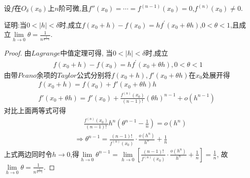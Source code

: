\documentclass[lang=cn,newtx,10pt,scheme=chinese]{elegantbook}
\begin{document}
\begin{exercise}
    设\(f\)在\(O_{\delta}(x_0)\)上\(n\)阶可微,且\(f''(x_0)=\cdots =f^{(n - 1)}(x_0)=0\),\(f^{(n)}(x_0)\neq0\).
    
    证明:当\(0<|h|<\delta\)时,成立\(f(x_0 + h)-f(x_0)=hf^{\prime}(x_0+\theta h)\),\(0<\theta<1\),且成立$\lim\limits_{h\to0}\theta=\frac{1}{n^{\frac{1}{n - 1}}}$.
\end{exercise}
    \begin{proof}
        由$Lagrange$中值定理可得,
        当\(0<|h|<\delta\)时,成立
        \begin{gather}
            f(x_0 + h)-f(x_0)=hf^{\prime}(x_0+\theta h),0<\theta<1
            \nonumber
        \end{gather}
        由带$Peano$余项的$Taylor$公式分别将$f\left( x_0+h \right),f'\left( x_0+\theta h \right)$在$x_0$处展开得
        \begin{gather}
            f\left( x_0+h \right) =f\left( x_0 \right) +f'\left( x_0+\theta h \right) h
            \nonumber\\
            f'\left( x_0+\theta h \right) =f'\left( x_0 \right) +\frac{f^{\left( n \right)}\left( x_0 \right)}{\left( n-1 \right) !}\left( \theta h \right) ^{n-1}+o\left( h^{n-1} \right) \,\,
            \nonumber
        \end{gather}
        对比上面两等式可得
        \begin{equation}
            \begin{split}
                &\,\,\,\,\,\,\,\,\frac{f^{\left( n \right)}\left( x_0 \right)}{\left( n-1 \right) !}h^n\left( \theta ^{n-1}-\frac{1}{n} \right) =o\left( h^n \right) 
                \\
                &\Rightarrow \theta ^{n-1}=\frac{\left( n-1 \right) !}{f^{\left( n \right)}\left( x_0 \right)}\cdot \frac{o\left( h^n \right)}{h^n}+\frac{1}{n}    
            \end{split}
            \nonumber
        \end{equation}
        上式两边同时令$h\to0$,得$\underset{h\rightarrow 0}{\lim}\theta ^{n-1}=\underset{h\rightarrow 0}{\lim}\left[ \frac{\left( n-1 \right) !}{f^{\left( n \right)}\left( x_0 \right)}\cdot \frac{o\left( h^n \right)}{h^n}+\frac{1}{n} \right] =\frac{1}{n}$,
        故$\underset{h\rightarrow 0}{\lim}\theta =\frac{1}{n^{\frac{1}{n-1}}}$.
    \end{proof}
\end{document}

